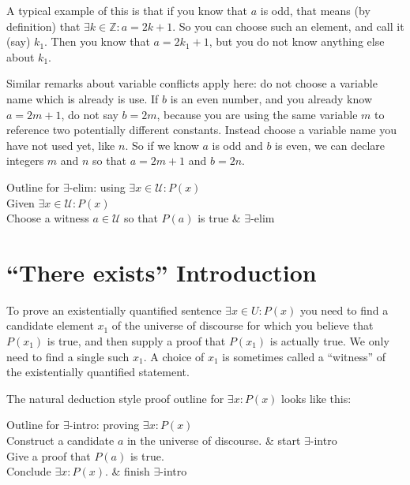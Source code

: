A typical example of this is that if you know that $a$ is odd, that means (by definition) that $\exists k \in \mathbb{Z}: a=2k+1$.  So you can choose such an element, and call it (say) $k_1$.  Then you know that $a=2k_1+1$, but you do not know anything else about $k_1$.  

Similar remarks about variable conflicts apply here:  do not choose a variable name which is already is use.  If $b$ is an even number, and you already know $a=2m+1$, do not say $b = 2m$, because you are using the same variable $m$ to reference two potentially different constants.  Instead choose a variable name you have not used yet, like $n$.  So if we know $a$ is odd and $b$ is even, we can declare integers $m$ and $n$ so that $a=2m+1$ and $b = 2n$.

\begin{fitch*}
	\textrm{Outline for $\exists$-elim:  using $\exists x \in \mathcal{U}: P(x)$}\\
	\hspace{1 cm} \textrm{Given $\exists x \in \mathcal{U}: P(x)$}\\
	\hspace{1 cm}\textrm{Choose a witness $a \in \mathcal{U}$ so that $P(a)$ is true} & $\exists$-elim
	\end{fitch*}


\section{``There exists'' Introduction}

To prove an existentially quantified sentence $\exists x \in U: P(x)$ you need to find a candidate element $x_1$ of the universe of discourse for which you believe that $P(x_1)$ is true, and then supply a proof that $P(x_1)$ is actually true.  We only need to find a single such $x_1$.  A choice of $x_1$ is sometimes called a ``witness'' of the existentially quantified statement.

The natural deduction style proof outline for $\exists x:  P(x)$ looks like this:

\begin{fitch*}
	\textrm{Outline for $\exists$-intro:  proving $\exists x: P(x)$}\\
	\hspace{1 cm} \textrm{Construct a candidate $a$ in the universe of discourse.} & start $\exists$-intro\\
	\hspace{1 cm} \textrm{Give a proof that $P(a)$ is true.}\\
	\hspace{1 cm} \textrm{Conclude $\exists x: P(x)$.} & finish $\exists$-intro
\end{fitch*} 

